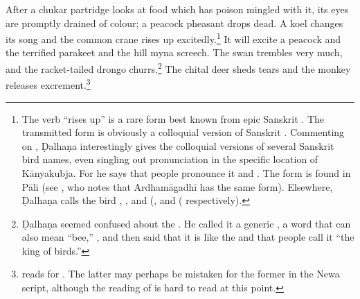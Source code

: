 \begin{translation}

After a chukar partridge %
looks at food which has poison mingled with it, its eyes are promptly drained of
colour; a peacock pheasant %
drops dead.  A koel %
changes its song and the common crane %
rises up excitedly.\footnote{The verb  “rises up” is a rare form
best known from epic Sanskrit \citep[see][212, \S 7.6.1]{ober-2003}.   The
transmitted form  is obviously a colloquial version of Sanskrit
.  Commenting on , Ḍalhaṇa interestingly gives the
colloquial versions of several Sanskrit bird names, even singling out
pronunciation in the specific location of Kānyakubja.  For  he says
that people pronounce it  and .  The form 
is found in Pāli (see \cite[731]{cone-dict}, who notes that Ardhamāgadhī has the
same form). Elsewhere, Ḍalhaṇa calls the bird ,  , and 
(,  and
( respectively).}  It will excite a peacock 
and the terrified parakeet %
and the hill myna %
screech. The swan %
trembles very much, and the racket-tailed drongo %
churrs.\footnote{Ḍalhaṇa seemed confused about the .  He called it a generic , a word that can also mean 
“bee,” \citep[62]{dave}, and then said that it is like the
 \citep[for a nice explanation of this name,
see][62--63]{dave} and that people call it “the king of birds.”} The chital deer
sheds tears and the
monkey releases excrement.\footnote{ reads 
 for
.  The latter may perhaps be mistaken for the former in
the Newa script, although the reading of  is hard to 
read at this point.}


\end{translation}
